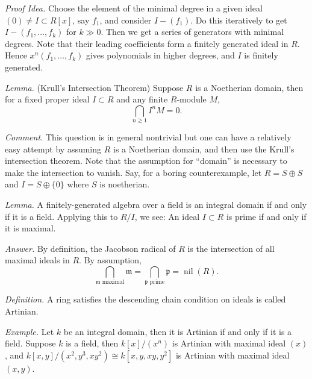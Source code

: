 \documentclass{mathproblems}
\begin{document}
\begin{questions}
\textit{Proof Idea.} Choose the element of the minimal degree in a given ideal $(0)\neq I\subset R[x]$, say $f_1$, and consider $I-(f_1)$. Do this iteratively to get $I-(f_1,\ldots,f_k)$ for $k\gg 0$. Then we get a series of generators with minimal degrees. Note that their leading coefficients form a finitely generated ideal in $R$. Hence $x^n(f_1,\ldots,f_k)$ gives polynomials in higher degrees, and $I$ is finitely generated.


{\color{violet}
\textit{Lemma.} (Krull's Intersection Theorem) Suppose $R$ is a Noetherian domain, then for a fixed proper ideal $I\subset R$ and any finite $R$-module $M$, \vspace{-6pt}
$$
\bigcap_{n\geqslant 1} I^n M=0.
$$} \vspace{-16pt}

\textit{Comment.} This question is in general nontrivial but one can have a relatively easy attempt by assuming $R$ is a Noetherian domain, and then use the Krull's intersection theorem. Note that the assumption for ``domain'' is necessary to make the intersection to vanish. Say, for a boring counterexample, let $R=S\oplus S$ and $I=S\oplus \{0\}$ where $S$ is noetherian. 



{\color{violet}
\textit{Lemma.} A finitely-generated algebra over a field is an integral domain if and only if it is a field. Applying this to $R/I$, we see: An ideal $I\subset R$ is prime if and only if it is maximal.
}

\textit{Answer.} By definition, the Jacobson radical of $R$ is the intersection of all maximal ideals in $R$. By assumption,
$$
\bigcap_{\mathfrak{m}\text{ maximal}}\mathfrak{m}=\bigcap_{\mathfrak{p}\text{ prime}}\mathfrak{p}=\operatorname{nil}(R).
$$



\textit{Definition.} A ring satisfies the descending chain condition on ideals is called Artinian.

\textit{Example.} Let $k$ be an integral domain, then it is Artinian if and only if it is a field. Suppose $k$ is a field, then $k[x]/(x^n)$ is Artinian with maximal ideal $(x)$, and $k[x,y]/(x^2,y^3,xy^2)\cong k[x,y,xy,y^2]$ is Artinian with maximal ideal $(x,y)$.


\end{questions}
\end{document}
